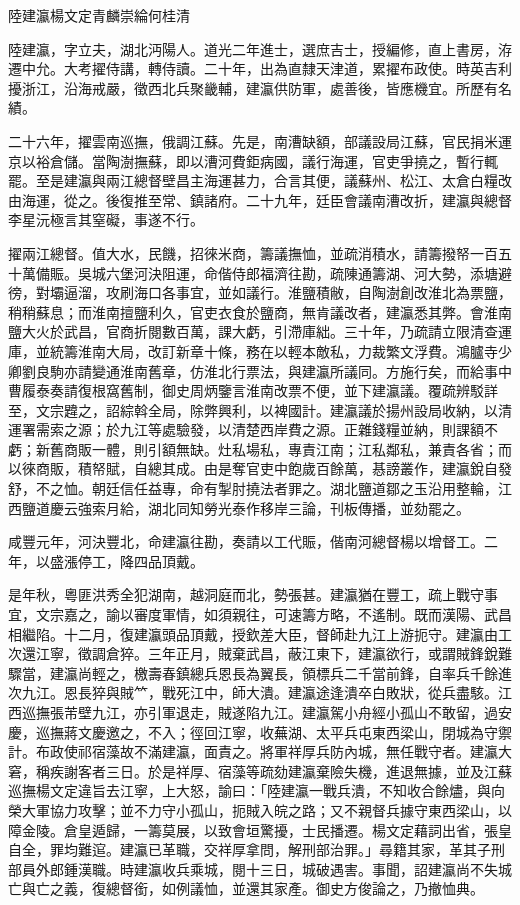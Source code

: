 
\begin{pinyinscope}
陸建瀛楊文定青麟崇綸何桂清

陸建瀛，字立夫，湖北沔陽人。道光二年進士，選庶吉士，授編修，直上書房，洊遷中允。大考擢侍講，轉侍讀。二十年，出為直隸天津道，累擢布政使。時英吉利擾浙江，沿海戒嚴，徵西北兵聚畿輔，建瀛供防軍，處善後，皆應機宜。所歷有名績。

二十六年，擢雲南巡撫，俄調江蘇。先是，南漕缺額，部議設局江蘇，官民捐米運京以裕倉儲。當陶澍撫蘇，即以漕河費鉅病國，議行海運，官吏爭撓之，暫行輒罷。至是建瀛與兩江總督壁昌主海運甚力，合言其便，議蘇州、松江、太倉白糧改由海運，從之。後復推至常、鎮諸府。二十九年，廷臣會議南漕改折，建瀛與總督李星沅極言其窒礙，事遂不行。

擢兩江總督。值大水，民饑，招徠米商，籌議撫恤，並疏消積水，請籌撥帑一百五十萬備賑。吳城六堡河決阻運，命偕侍郎福濟往勘，疏陳通籌湖、河大勢，添塘避徬，對壩逼溜，攻刷海口各事宜，並如議行。淮鹽積敝，自陶澍創改淮北為票鹽，稍稍蘇息；而淮南擅鹽利久，官吏衣食於鹽商，無肯議改者，建瀛悉其弊。會淮南鹽大火於武昌，官商折閱數百萬，課大虧，引滯庫絀。三十年，乃疏請立限清查運庫，並統籌淮南大局，改訂新章十條，務在以輕本敵私，力裁繁文浮費。鴻臚寺少卿劉良駒亦請變通淮南舊章，仿淮北行票法，與建瀛所議同。方施行矣，而給事中曹履泰奏請復根窩舊制，御史周炳鑒言淮南改票不便，並下建瀛議。覆疏辨駁詳至，文宗韙之，詔綜斡全局，除弊興利，以裨國計。建瀛議於揚州設局收納，以清運署需索之源；於九江等處驗發，以清楚西岸費之源。正雜錢糧並納，則課額不虧；新舊商販一體，則引額無缺。灶私場私，專責江南；江私鄰私，兼責各省；而以徠商販，積帑賦，自總其成。由是奪官吏中飽歲百餘萬，惎謗叢作，建瀛銳自發舒，不之恤。朝廷信任益專，命有掣肘撓法者罪之。湖北鹽道鄒之玉沿用整輪，江西鹽道慶云強索月給，湖北同知勞光泰作移岸三論，刊板傳播，並劾罷之。

咸豐元年，河決豐北，命建瀛往勘，奏請以工代賑，偕南河總督楊以增督工。二年，以盛漲停工，降四品頂戴。

是年秋，粵匪洪秀全犯湖南，越洞庭而北，勢張甚。建瀛猶在豐工，疏上戰守事宜，文宗嘉之，諭以審度軍情，如須親往，可速籌方略，不遙制。既而漢陽、武昌相繼陷。十二月，復建瀛頭品頂戴，授欽差大臣，督師赴九江上游扼守。建瀛由工次還江寧，徵調倉猝。三年正月，賊棄武昌，蔽江東下，建瀛欲行，或謂賊鋒銳難驟當，建瀛尚輕之，檄壽春鎮總兵恩長為翼長，領標兵二千當前鋒，自率兵千餘進次九江。恩長猝與賊𥫗，戰死江中，師大潰。建瀛途逢潰卒白敗狀，從兵盡駭。江西巡撫張芾壁九江，亦引軍退走，賊遂陷九江。建瀛駕小舟經小孤山不敢留，過安慶，巡撫蔣文慶邀之，不入；徑回江寧，收蕪湖、太平兵屯東西梁山，閉城為守禦計。布政使祁宿藻故不滿建瀛，面責之。將軍祥厚兵防內城，無任戰守者。建瀛大窘，稱疾謝客者三日。於是祥厚、宿藻等疏劾建瀛棄險失機，進退無據，並及江蘇巡撫楊文定違旨去江寧，上大怒，諭曰：「陸建瀛一戰兵潰，不知收合餘燼，與向榮大軍協力攻擊；並不力守小孤山，扼賊入皖之路；又不親督兵據守東西梁山，以障金陵。倉皇遁歸，一籌莫展，以致會垣驚擾，士民播遷。楊文定藉詞出省，張皇自全，罪均難逭。建瀛已革職，交祥厚拿問，解刑部治罪。」尋籍其家，革其子刑部員外郎鍾漢職。時建瀛收兵乘城，閱十三日，城破遇害。事聞，詔建瀛尚不失城亡與亡之義，復總督銜，如例議恤，並還其家產。御史方俊論之，乃撤恤典。


\end{pinyinscope}
